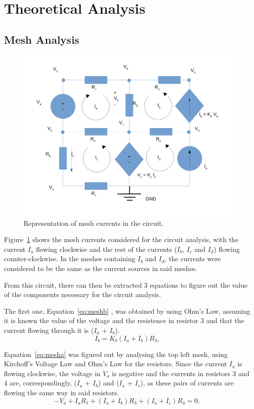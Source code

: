 \newpage
\section{Theoretical Analysis}
\label{sec:analysis}

\subsection{Mesh Analysis}
\begin{figure}[h] \centering
\includegraphics[width=0.8\linewidth]{rc1.pdf}
\caption{Representation of mesh currents in the circuit.}
\label{fig:meshcurrents}
\end{figure}

Figure~\ref{fig:meshcurrents} shows the mesh currents considered for the circuit analysis, with the current $I_a$ flowing clockwise and the rest of the currents ($I_b$, $I_c$ and $I_d$) flowing counter-clockwise. In the meshes containing $I_b$ and $I_d$, the currents were considered to be the same as the current sources in said meshes.

From this circuit, there can then be extracted 3 equations to figure out the value of the components necessary for the circuit analysis.

The first one, Equation~\ref{eq:meshb} , was obtained by using Ohm's Law, assuming it is known the value of the voltage and the resistence in resistor 3 and that the current flowing through it is ($I_a$ + $I_b$).
\begin{equation}
  I_{b} = K_{b}(I_{a} + I_{b})R_{3},
  \label{eq:meshb}
\end{equation}

Equation~\ref{eq:mesha}  was figured out by analysing the top left mesh, using Kirchoff's Voltage Law and Ohm's Law for the resistors. Since the current $I_a$ is flowing clockwise, the voltage in $V_a$ is negative and the currents in resistors 3 and 4 are, 
correspondingly, ($I_a$ + $I_b$) and ($I_a$ + $I_c$), as these pairs of currents are flowing the same way in said resistors.
\begin{equation}
  -V_{a} + I_{a}R_{1} + (I_{a} + I_{b})R_{3} + (I_{a} + I_{c})R_{4} = 0,
  \label{eq:mesha}
\end{equation}

